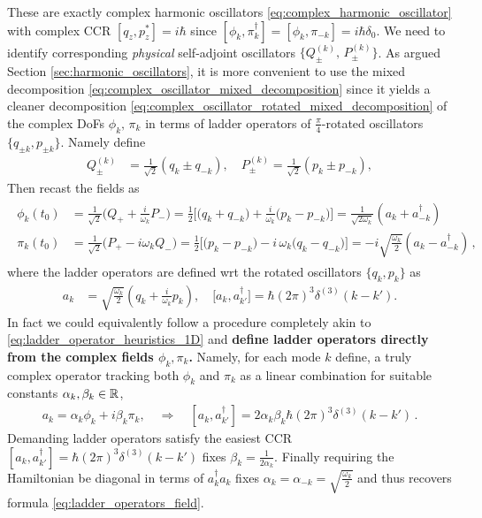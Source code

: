 \documentclass[../QFT_main.tex]{subfiles}
\begin{document}
\begin{mytheorem}
These are exactly complex harmonic oscillators \eqref{eq:complex_harmonic_oscillator} with complex CCR $[q_z, p_z^*] = i\hbar$ since $[\phi_k, \pi_k^\dagger]=[\phi_k, \pi_{-k}] = i\hbar \delta_0$.
We need to identify corresponding \emph{physical} self-adjoint oscillators $\{Q^{(k)}_\pm,\,P^{(k)}_\pm\}$.
As argued Section \ref{sec:harmonic_oscillators}, it is more convenient to use the mixed decomposition \eqref{eq:complex_oscillator_mixed_decomposition} since it yields a cleaner decomposition \eqref{eq:complex_oscillator_rotated_mixed_decomposition} of the complex DoFs $\phi_k,\,\pi_k$ in terms of ladder operators of $\frac{\pi}{4}$-rotated oscillators $\{q_{\pm k}, p_{\pm k}\}$.
Namely define
\begin{align}
    Q^{(k)}_\pm &= \frac{1}{\sqrt{2}} (q_k \pm q_{-k}), \quad P^{(k)}_\pm = \frac{1}{\sqrt{2}} (p_k \pm p_{-k}),
\end{align}
Then recast the fields as
\begin{align}\label{eq:relations_fields_creation_operators_harmonic_oscillator_var}
\begin{aligned}
    \phi_k(t_0) &= \frac{1}{\sqrt{2}}\Big(Q_++\frac{i}{\omega_k} P_-\Big) = \tfrac{1}{2}\Big[\big({q}_k+{q}_{-k}\big) + \tfrac{i}{\omega_k}\big({p}_k - {p}_{-k}\big) \Big]
    =\frac{1}{\sqrt{2\omega_k}} (a_k + a_{-k}^{\dagger}) 
    \\
    \pi_k(t_0) &= \frac{1}{\sqrt{2}}\Big(P_+ - i \omega_k Q_-\Big) = \tfrac{1}{2}\Big[ \big({p}_k - {p}_{-k}\big) -i\,\omega_k\big({q}_k-{q}_{-k}\big)\Big]
    = -i \sqrt{\frac{\omega_k}{2}} (a_k - a_{-k}^{\dagger})\,,
\end{aligned}
\end{align}
where the ladder operators are defined wrt the rotated oscillators $\{q_k, p_k\}$ as
\begin{align}\label{eq:ladder_operators_field}
    a_k &= \sqrt{\frac{\omega_k}{2}} \left( q_k + \frac{i}{\omega_k} p_k \right), \quad
    \big[ a_k, a_{k'}^{\dagger} \big] = \hbar (2\pi)^3 \delta^{(3)}(k-k').
\end{align}
In fact we could equivalently follow a procedure completely akin to \eqref{eq:ladder_operator_heuristics_1D} and \textbf{define ladder operators directly from the complex fields $\phi_k, \pi_k$.}
Namely, for each mode $k$ define, a truly complex operator tracking both $\phi_k$ and $\pi_k$ as a linear combination for suitable constants $\alpha_k, \beta_k\in\mathbb{R}$,
\begin{align}
    a_k=\alpha_k \phi_k + i \beta_k \pi_k, \quad \Rightarrow\quad [a_k,a_{k'}^\dagger]= 2\alpha_k\beta_k\hbar (2\pi)^3 \delta^{(3)}(k-k')\,.
\end{align}
Demanding ladder operators satisfy the easiest CCR $[a_k,a_{k'}^\dagger]=\hbar (2\pi)^3 \delta^{(3)}(k-k')$ fixes $\beta_k=\frac{1}{2\alpha_k}$.
Finally requiring the Hamiltonian be diagonal in terms of $a_k^\dagger a_k$ fixes $\alpha_k=\alpha_{-k}=\sqrt{\frac{\omega_k}{2}}$ and thus recovers formula  \eqref{eq:ladder_operators_field}.


\end{mytheorem}
\end{document}
